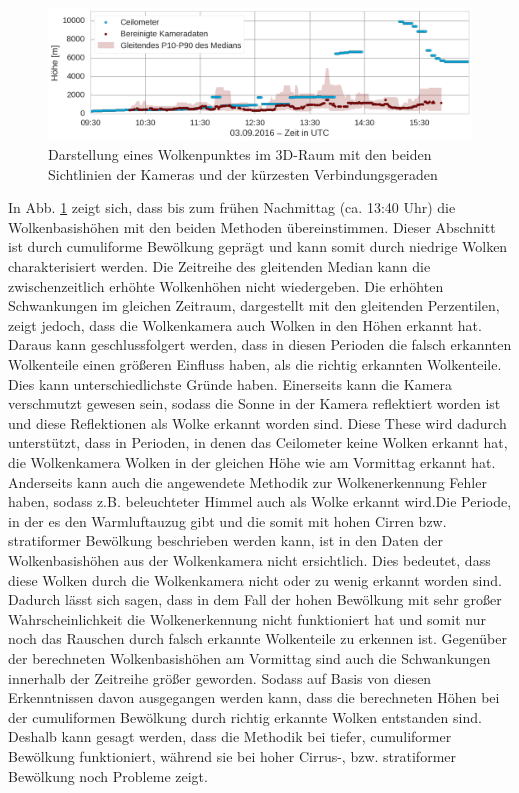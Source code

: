 \documentclass[a4paper,11pt,twoside,german]{article}
\newcommand{\absatz}{\smallbreak}
\begin{document}
\begin{figure}[h]
	\begin{center}
		\includegraphics[width=1\textwidth]{media/ceilo_cam_new.png}
		\caption[Zeitreihenvergleich Wolkenkameras mit Ceilometer]{Darstellung eines Wolkenpunktes im 3D-Raum mit den beiden Sichtlinien der Kameras und der kürzesten Verbindungsgeraden}
		\label{FIGCeilo}
	\end{center}
\end{figure}

In Abb. \ref{FIGCeilo} zeigt sich, dass bis zum frühen Nachmittag (ca. 13:40
Uhr) die Wolkenbasishöhen mit den beiden Methoden übereinstimmen. Dieser
Abschnitt ist durch cumuliforme Bewölkung geprägt und kann somit durch niedrige
Wolken charakterisiert werden. Die Zeitreihe des gleitenden Median kann die
zwischenzeitlich erhöhte Wolkenhöhen nicht wiedergeben. Die erhöhten
Schwankungen im gleichen Zeitraum, dargestellt mit den gleitenden Perzentilen,
zeigt jedoch, dass die Wolkenkamera auch Wolken in den Höhen erkannt hat. Daraus
kann geschlussfolgert werden, dass in diesen Perioden die falsch erkannten
Wolkenteile einen größeren Einfluss haben, als die richtig erkannten
Wolkenteile. Dies kann unterschiedlichste Gründe haben. Einerseits kann die
Kamera verschmutzt gewesen sein, sodass die Sonne in der Kamera reflektiert
worden ist und diese Reflektionen als Wolke erkannt worden sind. Diese These
wird dadurch unterstützt, dass in Perioden, in denen das Ceilometer keine Wolken
erkannt hat, die Wolkenkamera Wolken in der gleichen Höhe wie am Vormittag
erkannt hat. Anderseits kann auch die angewendete Methodik zur Wolkenerkennung
Fehler haben, sodass z.B. beleuchteter Himmel auch als Wolke erkannt
wird.\absatz Die Periode, in der es den Warmluftauzug gibt und die somit mit
hohen Cirren bzw. stratiformer Bewölkung beschrieben werden kann, ist in den
Daten der Wolkenbasishöhen aus der Wolkenkamera nicht ersichtlich. Dies
bedeutet, dass diese Wolken durch die Wolkenkamera nicht oder zu wenig erkannt
worden sind. Dadurch lässt sich sagen, dass in dem Fall der hohen Bewölkung mit
sehr großer Wahrscheinlichkeit die Wolkenerkennung nicht funktioniert hat und
somit nur noch das Rauschen durch falsch erkannte Wolkenteile zu erkennen ist.
Gegenüber der berechneten Wolkenbasishöhen am Vormittag sind auch die
Schwankungen innerhalb der Zeitreihe größer geworden. Sodass auf Basis von
diesen Erkenntnissen davon ausgegangen werden kann, dass die berechneten Höhen
bei der cumuliformen Bewölkung durch richtig erkannte Wolken entstanden sind.
Deshalb kann gesagt werden, dass die Methodik bei tiefer, cumuliformer Bewölkung
funktioniert, während sie bei hoher Cirrus-, bzw. stratiformer Bewölkung
noch Probleme zeigt.  
\end{document}
